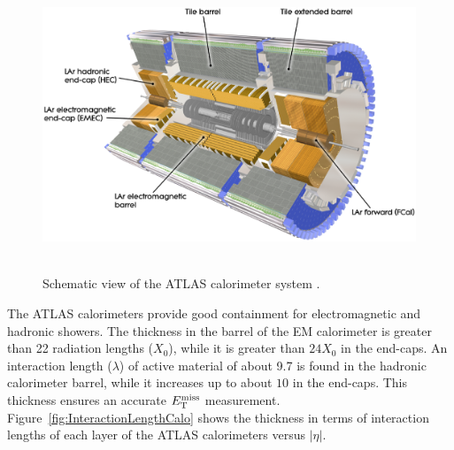 \begin{figure}[!ht]
  \begin{center}
    \mbox{
      \includegraphics[width=0.995\textwidth]{ATLASdetector/Figures/Calorimeter.eps}
    }
  \end{center}
  \caption[Schematic view of the ATLAS calorimeter system.]{Schematic view of the ATLAS calorimeter system \protect\cite{Evans:2008zzb}.}
  \label{fig:CalorimetersSchema}
\end{figure}

The ATLAS calorimeters provide good containment for electromagnetic and hadronic showers. 
The thickness in the barrel of the EM calorimeter is greater than 22 radiation lengths ($X_0$), while it is greater than $24X_0$ in the end-caps.
An interaction length ($\lambda$) of active material of about 9.7 is found in the hadronic calorimeter barrel, while it increases up to about $10$ in the end-caps.
This thickness ensures an accurate $E_{\mathrm{T}}^{\mathrm{miss}}$ measurement.
Figure~\ref{fig:InteractionLengthCalo} shows the thickness in terms of interaction lengths of each layer of the ATLAS calorimeters versus $|\eta|$.

